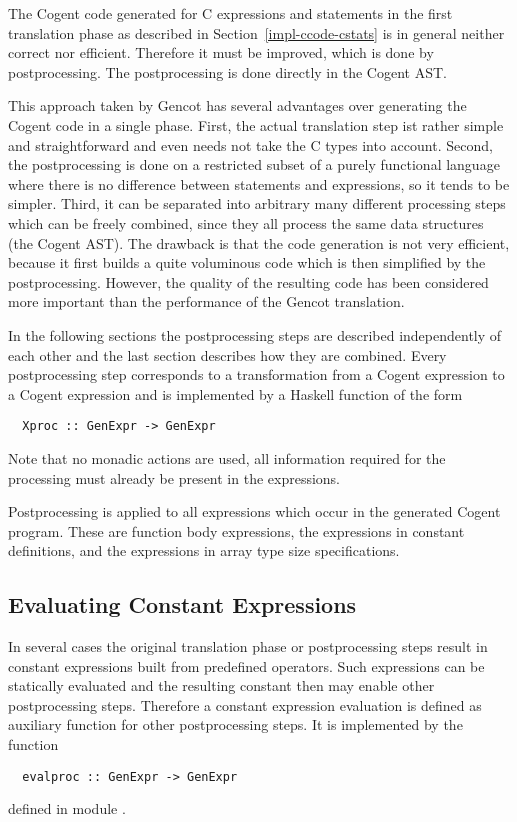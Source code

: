 The Cogent code generated for C expressions and statements in the first translation phase as described in 
Section~\ref{impl-ccode-cstats} is in general neither correct nor efficient. Therefore it must be improved, 
which is done by postprocessing. The postprocessing is done directly in the Cogent AST. 

This approach taken by Gencot has several advantages over generating the Cogent code in a single phase.
First, the actual translation step ist rather simple and straightforward and even needs not take the C types
into account. Second, the postprocessing is done on a restricted subset of a purely functional language where 
there is no difference between statements and expressions, so it tends to be simpler. Third, it can be separated
into arbitrary many different processing steps which can be freely combined, since they all process the same
data structures (the Cogent AST). The drawback is that the code generation is not very efficient, because it
first builds a quite voluminous code which is then simplified by the postprocessing. However, the quality 
of the resulting code has been considered more important than the performance of the Gencot translation.

In the following sections the postprocessing steps are described independently of each other and the last
section describes how they are combined. Every postprocessing step corresponds to a transformation from
a Cogent expression to a Cogent expression and is implemented by a Haskell function of the form
\begin{verbatim}
  Xproc :: GenExpr -> GenExpr
\end{verbatim}
Note that no monadic actions are used, all information required for the processing must already be present in the 
expressions.

Postprocessing is applied to all expressions which occur in the generated Cogent program. These are function 
body expressions, the expressions in constant definitions, and the expressions in array type size specifications.

\subsection{Evaluating Constant Expressions}
\label{impl-post-const}

In several cases the original translation phase or postprocessing steps result in constant expressions built
from predefined operators. Such expressions can be statically evaluated and the resulting constant then may
enable other postprocessing steps. Therefore a constant expression evaluation is defined as auxiliary 
function for other postprocessing steps. It is implemented by the function
\begin{verbatim}
  evalproc :: GenExpr -> GenExpr
\end{verbatim}
defined in module .


